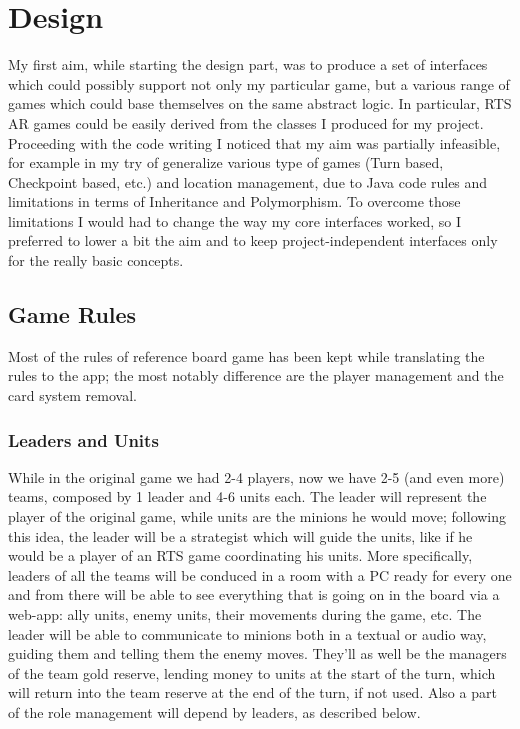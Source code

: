\chapter{Design}

	My first aim, while starting the design part, was to produce a set of interfaces which could possibly support not only my particular game, but a various range of games which could base themselves on the same abstract logic.
	In particular, RTS AR games could be easily derived from the classes I produced for my project.
	Proceeding with the code writing I noticed that my aim was partially infeasible, for example in my try of generalize various type of games (Turn based, Checkpoint based, etc.) and location management, due to Java code rules and limitations in terms of Inheritance and Polymorphism.
	To overcome those limitations I would had to change the way my core interfaces worked, so I preferred to lower a bit the aim and to keep project-independent interfaces only for the really basic concepts.

	\section{Game Rules}
		
		Most of the rules of reference board game has been kept while translating the rules to the app; the most notably difference are the player management and the card system removal.
		
		\subsection{Leaders and Units}
		
			While in the original game we had 2-4 players, now we have 2-5 (and even more) teams, composed by 1 leader and 4-6 units each.
			The leader will represent the player of the original game, while units are the minions he would move; following this idea, the leader will be a strategist which will guide the units, like if he would be a player of an RTS game coordinating his units.
			More specifically, leaders of all the teams will be conduced in a room with a PC ready for every one and from there will be able to see everything that is going on in the board via a web-app: ally units, enemy units, their movements during the game, etc.
			The leader will be able to communicate to minions both in a textual or audio way, guiding them and telling them the enemy moves.
			They'll as well be the managers of the team gold reserve, lending money to units at the start of the turn, which will return into the team reserve at the end of the turn, if not used.
			Also a part of the role management will depend by leaders, as described below. 
		
